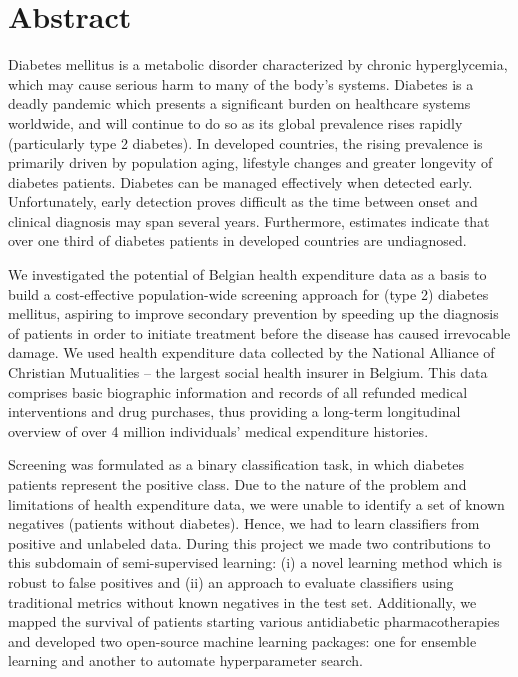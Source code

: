 \chapter{Abstract}                                 \label{ch:abstract}
Diabetes mellitus is a metabolic disorder characterized by chronic hyperglycemia, which may cause serious harm to many of the body's systems. Diabetes is a deadly pandemic which presents a significant burden on healthcare systems worldwide, and will continue to do so as its global prevalence rises rapidly (particularly type 2 diabetes). In developed countries, the rising prevalence is primarily driven by population aging, lifestyle changes and greater longevity of diabetes patients. Diabetes can be managed effectively when detected early. Unfortunately, early detection proves difficult as the time between onset and clinical diagnosis may span several years. Furthermore, estimates indicate that over one third of diabetes patients in developed countries are undiagnosed.


We investigated the potential of Belgian health expenditure data as a basis to build a cost-effective population-wide screening approach for (type 2) diabetes mellitus, aspiring to improve secondary prevention by speeding up the diagnosis of patients in order to initiate treatment before the disease has caused irrevocable damage. We used health expenditure data collected by the National Alliance of Christian Mutualities -- the largest social health insurer in Belgium. This data comprises basic biographic information and records of all refunded medical interventions and drug purchases, thus providing a long-term longitudinal overview of over 4 million individuals' medical expenditure histories.

Screening was formulated as a binary classification task, in which diabetes patients represent the positive class. Due to the nature of the problem and limitations of health expenditure data, we were unable to identify a set of known negatives (patients without diabetes). Hence, we had to learn classifiers from positive and unlabeled data. During this project we made two contributions to this subdomain of semi-supervised learning: (i) a novel learning method which is robust to false positives and (ii) an approach to evaluate classifiers using traditional metrics without known negatives in the test set. Additionally, we mapped the survival of patients starting various antidiabetic pharmacotherapies and developed two open-source machine learning packages: one for ensemble learning and another to automate hyperparameter search.

